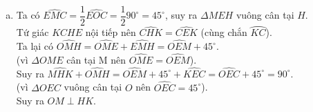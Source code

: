\begin{ex}
{\begin{enumerate}[a)]
Dấu "$=$" xảy ra khi và chỉ khi $\sqrt{R^2-x^2}=x \Leftrightarrow x=\dfrac{R\sqrt{2}}{2}$.\\
Từ đó ta có $AI=\sqrt{R^2-x^2}=\dfrac{R\sqrt{2}}{2}$.\\
 Vậy điểm $A $ thuộc đường tròn $(O)$ sao cho khoảng cách từ $A$ đến $BC$ bằng $\dfrac{R\sqrt{2}}{2}$.
\item Ta có $\widehat{EMC}=\dfrac{1}{2} \widehat{EOC}=\dfrac{1}{2}90^\circ=45^\circ$, suy ra $\Delta MEH$ vuông cân tại $H$.\\
Tứ giác $KCHE$ nội tiếp nên $\widehat{CHK}=\widehat{CEK}$ (cùng chắn $\wideparen{KC}$).\\
Ta lại có $\widehat{OMH}=\widehat{OME}+\widehat{EMH}=\widehat{OEM}+45^\circ$. \\
(vì $\Delta OME $ cân tại M nên $\widehat{OME}=\widehat{OEM}$).\\
Suy ra $\widehat{MHK}+\widehat{OMH}=\widehat{OEM}+45^\circ+\widehat{KEC}=\widehat{OEC}+45^\circ =90^\circ$. \\
(vì $\Delta OEC$ vuông cân tại $O $ nên $\widehat{OEC}=45^\circ$).\\
Suy ra $OM \perp HK$.
\end{enumerate}
}
\end{ex}

